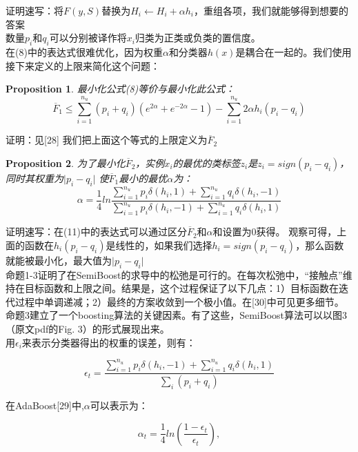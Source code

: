 \documentclass[10pt,journal,compsoc]{IEEEtran}
\newtheorem{prop}{Proposition}
\begin{document}
证明速写：将$F(y,S)$替换为$H_i\leftarrow H_i +\alpha h_i$，重组各项，我们就能够得到想要的答案\\

数量$p_i$和$q_i$可以分别被译作将$x_i$归类为正类或负类的置信度。\\
在(8)中的表达式很难优化，因为权重$\alpha$和分类器$h(x)$是耦合在一起的。我们使用接下来定义的上限来简化这个问题：
\begin{prop}
最小化公式(8)等价与最小化此公式：
\begin{equation*}
\overline{F}_1\leq\sum^{n_u}_{i=1}(p_i+q_i)(e^{2\alpha}+e^{-2\alpha}-1)-\sum^{n_u}_{i=1}2\alpha h_i(p_i-q_i)
\end{equation*}
\end{prop}
证明：见[28]
我们把上面这个等式的上限定义为$\overline{F}_2$

\begin{prop}
为了最小化$\overline{F}_2$，实例$x_i$的最优的类标签$z_i$是$z_i=sign(p_i-q_i)$，同时其权重为$\vert p_i-q_i\vert$
使$\overline{F}_1$最小的最优$\alpha$为：
\begin{equation}
\alpha = \frac{1}{4}ln\frac{\sum\nolimits^{n_u}_{i=1}p_i\delta(h_i,1)+\sum\nolimits^{n_u}_{i=1}q_i\delta(h_i,-1)}{\sum\nolimits^{n_u}_{i=1}p_i\delta(h_i,-1)+\sum\nolimits^{n_u}_{i=1}q_i\delta(h_i,1)}
\end{equation}
\end{prop}
证明速写：在(11)中的表达式可以通过区分$\overline{F}_2$和$\alpha$和设置为0获得。
观察可得，上面的函数在$h_i(p_i-q_i)$是线性的，如果我们选择$h_i=sign(p_i-q_i)$，那么函数就能被最小化，最大值为$\vert p_i-q_i\vert$\\
命题1-3证明了在SemiBoost的求导中的松弛是可行的。在每次松弛中，“接触点”维持在目标函数和上限之间。结果是，这个过程保证了以下几点：1）目标函数在迭代过程中单调递减；2）最终的方案收敛到一个极小值。在[30]中可见更多细节。命题3建立了一个boosting算法的关键因素。有了这些，SemiBoost算法可以以图3（原文pdf的Fig. 3）的形式展现出来。\\
用$\epsilon_i$来表示分类器得出的权重的误差，则有：
\begin{center}
\begin{equation*}
\epsilon_t=\frac{\sum^{n_u}_{i=1}p_i\delta(h_i,-1)+\sum\nolimits^{n_u}_{i=1}q_i\delta(h_i,1)}{\sum\nolimits_i(p_i+q_i)}
\end{equation*}
\end{center}

在AdaBoost[29]中,$\alpha$可以表示为：
\begin{center}
\begin{equation}
\alpha_t=\frac14ln(\frac{1-\epsilon_t}{\epsilon_t}),
\end{equation}
\end{center}
\end{document}
